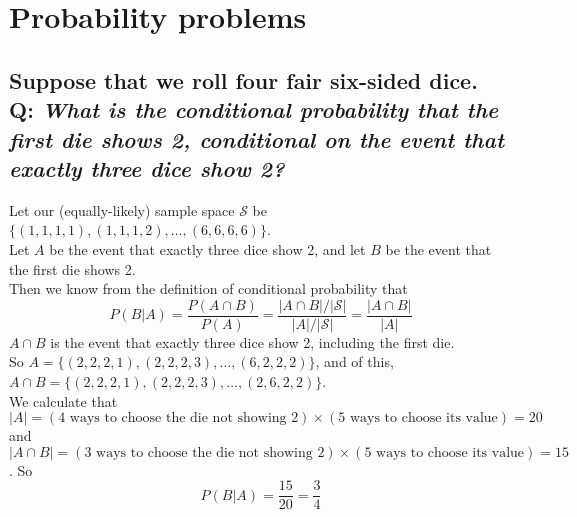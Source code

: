\documentclass{article}
\begin{document}
\section{\sc Probability problems}

\subsection*{{\normalsize Suppose that we roll four fair six-sided dice.}\\
Q: {\em What is the conditional probability that the first die shows 2, conditional on the event that exactly three dice show 2?}}

Let our (equally-likely) sample space $\mathcal{S}$ be $\{(1,1,1,1),(1,1,1,2),\ldots,(6,6,6,6)\}$.\\
Let $A$ be the event that exactly three dice show 2, and let $B$ be the event that the first die shows 2.\\
Then we know from the definition of conditional probability that
\begin{equation*}
P(B|A)=\dfrac{P(A\cap B)}{P(A)}=\dfrac{|A\cap B|/|\mathcal{S}|}{|A|/|\mathcal{S}|}=\dfrac{|A\cap B|}{|A|}
\end{equation*}
$A\cap B$ is the event that exactly three dice show 2, including the first die.\\
So $A=\{(2,2,2,1),(2,2,2,3),\ldots,(6,2,2,2)\}$, and of this,
$A\cap B=\{(2,2,2,1),(2,2,2,3),\ldots,(2,6,2,2)\}$.\\[1ex]
We calculate that $|A|=(4\text{ ways to choose the die not showing 2})\times(5\text{ ways to choose its value})=20$ and\\
$|A\cap B|=(3\text{ ways to choose the die not showing 2})\times(5\text{ ways to choose its value})=15$. So
\begin{equation*}
P(B|A)=\dfrac{15}{20}=\dfrac{3}{4}
\end{equation*}

%
\end{document}
